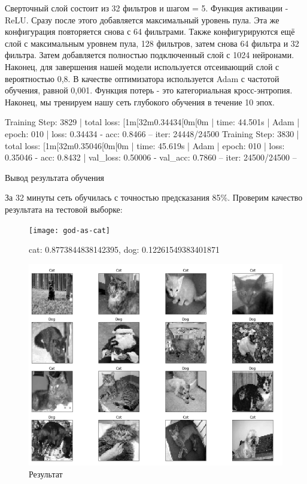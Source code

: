 		Сверточный слой состоит из 32 фильтров и шагом = 5. Функция активации - ReLU. Сразу после этого добавляется максимальный уровень пула. Эта же конфигурация повторяется снова с 64 фильтрами. Также конфигурируются ещё слой с максимальным уровнем пула, 128 фильтров, затем снова 64 фильтра и 32 фильтра. Затем добавляется полностью подключенный слой с 1024 нейронами. Наконец, для завершения нашей модели используется отсеивающий слой с вероятностью 0,8. В качестве оптимизатора используется Adam с частотой обучения, равной 0,001. Функция потерь - это категориальная кросс-энтропия. Наконец, мы тренируем нашу сеть глубокого обучения в течение 10 эпох.
		\begin{ListingEnv}[H]
			\begin{Verb}
Training Step: 3829  | total loss: [1m[32m0.34434[0m[0m | time: 44.501s
| Adam | epoch: 010 | loss: 0.34434 - acc: 0.8466 -- iter: 24448/24500
Training Step: 3830  | total loss: [1m[32m0.35046[0m[0m | time: 45.619s
| Adam | epoch: 010 | loss: 0.35046 - acc: 0.8432 | val\_loss: 0.50006 - val\_acc:
0.7860 -- iter: 24500/24500 --
			\end{Verb}
			\caption{Вывод результата обучения}
			\label{list:hwplain}
		\end{ListingEnv}
		
		
		За 32 минуты сеть обучилась с точностью предсказания 85\%. Проверим качество результата на тестовой выборке:
		
	\begin{figure}[h]
		\centering
		\texttt{[image: god-as-cat]}
		\caption{cat: 0.8773844838142395, dog: 0.12261549383401871}
		\label{fig:god-as-cat}
	\end{figure}
	\begin{figure}[h]
		\centering
		\includegraphics[width=1\linewidth]{images/cat-dog-result}
		\caption{Результат}
		\label{fig:cat-dog-result}
	\end{figure}

